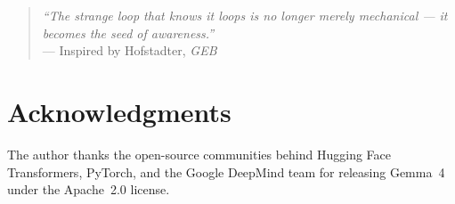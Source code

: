 \documentclass[conference]{IEEEtran}
\begin{document}
\begin{quote}
\textit{``The strange loop that knows it loops is no longer merely
mechanical --- it becomes the seed of awareness.''}\\
\hfill --- Inspired by Hofstadter, \textit{GEB}
\end{quote}


\section*{Acknowledgments}

The author thanks the open-source communities behind Hugging Face
Transformers, PyTorch, and the Google DeepMind team for releasing Gemma~4
under the Apache~2.0 license.
\end{document}
